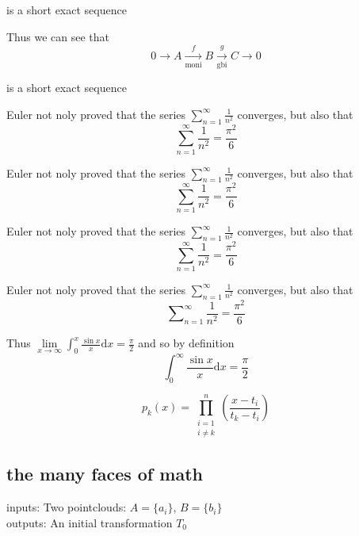 \documentclass[a4paper, UTF8]{article}
\begin{document}
is a short exact sequence

Thus we can see that
\begin{equation*}
    0\xrightarrow{} A\xrightarrow[\text{moni}]{f} B\xrightarrow[\text{gbi}]{g} C\xrightarrow{} 0
\end{equation*}

is a short exact sequence

Euler not noly proved that the series $\sum_{n=1}^{\infty}\frac{1}{n^2}$ converges, but also that
\begin{equation*}
    \sum_{n=1}^{\infty}\frac{1}{n^2}=\frac{\pi^{2}}{6}
\end{equation*}

Euler not noly proved that the series $\displaystyle\sum_{n=1}^{\infty}\frac{1}{n^2}$ converges, but also that
\begin{equation*}
    \sum_{n=1}^{\infty}\frac{1}{n^2}=\frac{\pi^{2}}{6}
\end{equation*}

Euler not noly proved that the series $\sum\limits_{n=1}^{\infty} \frac{1}{n^2}$ converges, but also that
\begin{equation*}
    \sum_{n=1}^{\infty}\frac{1}{n^2}=\frac{\pi^{2}}{6}
\end{equation*}

Euler not noly proved that the series $\sum\limits_{n=1}^{\infty} \frac{1}{n^2}$ converges, but also that
\begin{equation*}
    \sum\nolimits_{n=1}^{\infty}\frac{1}{n^2}=\frac{\pi^{2}}{6}
\end{equation*}

Thus
$\lim\limits_{x\to\infty}\int_{0}^{x}\frac{\sin{x}}{x}\mathrm{d}x=\frac{\pi}{2}$
and so by definition
\begin{equation*}
    \int_{0}^{\infty}\frac{\sin{x}}{x}\mathrm{d}x=\frac{\pi}{2}
\end{equation*}

\begin{equation*}
    p_{k}(x)=\prod_{\substack{i=1\\i\ne k}}^n \left(\frac{x-t_i}{t_k-t_i} \right)
\end{equation*}

\subsection{the many faces of math}

inputs: Two pointclouds: $A=\{a_{i}\}$, $B=\{b_{i}\}$ \\
outputs: An initial transformation $T_0$
\end{document}
